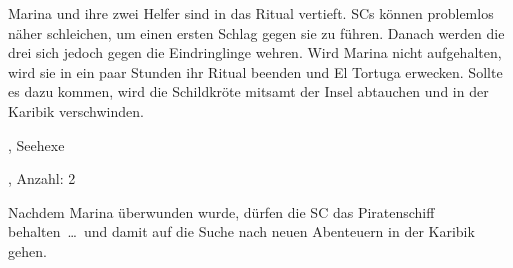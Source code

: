 {		Marina und ihre zwei Helfer sind in das Ritual vertieft. SCs können problemlos näher schleichen, um einen ersten Schlag gegen sie zu führen. Danach werden die drei sich jedoch gegen die Eindringlinge wehren. Wird Marina nicht aufgehalten, wird sie in ein paar Stunden ihr Ritual beenden und El Tortuga erwecken. Sollte es dazu kommen, wird die Schildkröte mitsamt der Insel abtauchen und in der Karibik verschwinden.

		, Seehexe

		, Anzahl: 2


		\noindent
		Nachdem Marina überwunden wurde, dürfen die SC das Piratenschiff behalten~\ldots~und damit auf die Suche nach neuen Abenteuern in der Karibik gehen.
}
